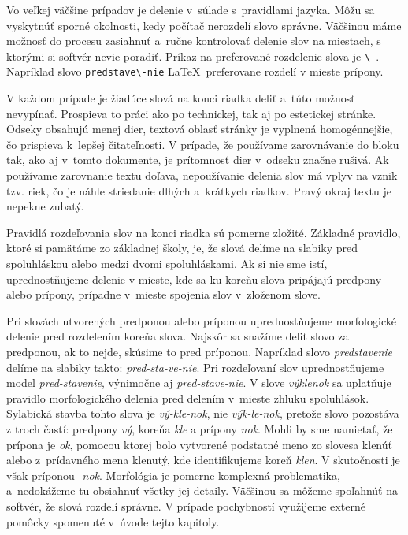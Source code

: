 \documentclass[../../../thesis.tex]{subfiles}
\begin{document}
Vo veľkej väčšine prípadov je delenie
v~súlade s~pravidlami jazyka.
Môžu sa vyskytnúť sporné okolnosti,
kedy počítač nerozdelí slovo správne.
Väčšinou máme možnosť do procesu zasiahnuť
a~ručne kontrolovať delenie slov na miestach,
s ktorými si softvér nevie poradiť.
Príkaz na preferované rozdelenie slova je \verb|\-|.
Napríklad slovo \verb|predstave\-nie| \LaTeX\
preferovane rozdelí v mieste prípony.

V každom prípade je žiadúce slová na konci riadka deliť
a\ túto možnosť nevypínať.
Prospieva to práci ako po technickej,
tak aj po estetickej stránke.
Odseky obsahujú menej dier,
textová oblasť stránky je vyplnená homogénnejšie,
čo prispieva k~lepšej čitateľnosti.
V prípade, že používame zarovnávanie do bloku tak,
ako aj v~tomto dokumente,
je prítomnosť dier v~odseku značne rušivá.
Ak používame zarovnanie textu doľava,
nepoužívanie delenia slov má vplyv na vznik tzv. riek,
čo je náhle striedanie dlhých a~krátkych riadkov.
Pravý okraj textu je nepekne zubatý.

Pravidlá rozdeľovania slov na konci riadka sú pomerne zložité.
Základné pravidlo, ktoré si pamätáme zo základnej školy,
je, že slová delíme na slabiky pred spoluhláskou alebo medzi
dvomi spoluhláskami.
Ak si nie sme istí, uprednostňujeme delenie v mieste,
kde sa ku koreňu slova pripájajú predpony alebo prípony,
prípadne v~mieste spojenia slov v~zloženom slove.

Pri slovách utvorených predponou alebo príponou
uprednostňujeme morfologické delenie
pred rozdelením koreňa slova.
Najskôr sa snažíme deliť slovo za predponou,
ak to nejde, skúsime to pred príponou.
Napríklad slovo \emph{predstavenie}
delíme na slabiky takto: \emph{pred-sta-ve-nie}.
Pri rozdeľovaní slov uprednostňujeme model
\emph{pred-stavenie}, výnimočne aj \emph{pred-stave-nie}.
V slove \emph{výklenok} sa uplatňuje pravidlo morfologického
delenia pred delením v~mieste zhluku spoluhlások.
Sylabická stavba tohto slova je \emph{vý-kle-nok},
nie \emph{výk-le-nok},
pretože slovo pozostáva z troch častí: predpony \emph{vý},
koreňa \emph{kle} a prípony \emph{nok}.
Mohli by sme namietať, že prípona je \emph{ok},
pomocou ktorej bolo vytvorené podstatné meno zo slovesa
klenúť alebo z~prídavného mena klenutý,
kde identifikujeme koreň \emph{klen}.
V skutočnosti je však príponou \emph{-nok}.
Morfológia je pomerne komplexná problematika,
a~nedokážeme tu obsiahnuť všetky jej detaily.
Väčšinou sa môžeme spoľahnúť na softvér,
že slová rozdelí správne.
V prípade pochybností využijeme externé pomôcky spomenuté
v~úvode tejto kapitoly.
\end{document}
